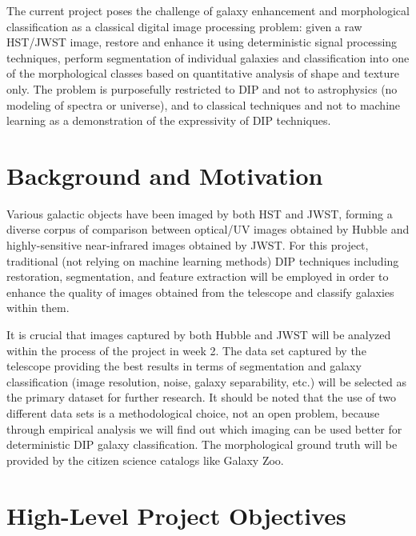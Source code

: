 \documentclass[11pt]{article}
\begin{document}
The current project poses the challenge of galaxy enhancement and morphological classification as a classical digital image processing problem: given a raw HST/JWST image, restore and enhance it using deterministic signal processing techniques, perform segmentation of individual galaxies and classification into one of the morphological classes based on quantitative analysis of shape and texture only. The problem is purposefully restricted to DIP and not to astrophysics (no modeling of spectra or universe), and to classical techniques and not to machine learning as a demonstration of the expressivity of DIP techniques.


\section{Background and Motivation}

Various galactic objects have been imaged by both HST and JWST, forming a diverse corpus of comparison
between optical/UV images obtained by Hubble and highly-sensitive near-infrared images obtained by
JWST. For this project, traditional (not relying on machine learning methods) DIP techniques including restoration,
segmentation, and feature extraction will be employed in order to enhance the quality of images obtained from the
telescope and classify galaxies within them.

It is crucial that images captured by both Hubble and JWST will be analyzed within the process of the project in week 2.
The data set captured by the telescope providing the best results in terms of segmentation and galaxy classification
(image resolution, noise, galaxy separability, etc.) will be selected as the primary dataset for further research. It should
be noted that the use of two different data sets is a methodological choice, not an open problem, because through
empirical analysis we will find out which imaging can be used better for deterministic DIP galaxy classification. The morphological ground truth will be provided by the citizen science catalogs like Galaxy Zoo.


\section{High-Level Project Objectives}
\end{document}
